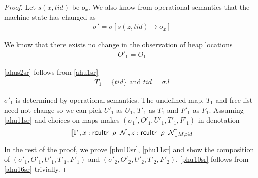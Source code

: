 \begin{proof}
Let $s(x,tid)$ be $o_x$. We also know from operational semantics that the machine state has changed as 
\begin{gather}\label{ahussr}
\sigma' =  \sigma[s(z,tid) \mapsto o_x ]
\end{gather}

We know that there exists no change in the observation of heap locations
\begin{gather}\label{ahus1sr}
O'_1 =  O_1
\end{gather}

\ref{ahus2sr} follows from \ref{ahu1sr}
\begin{gather}\label{ahus2sr}
  T_1 = \{tid\} \text{ and } tid = \sigma.l
\end{gather}

$\sigma'_1$ is determined by operational semantics. The undefined map, $T_1$ and free list need not change so we can pick $U'_1$ as $U_1$, $T'_1$  as $T_1$ and $F'_1$ as $F_1$. Assuming \ref{ahu11sr} and choices on maps makes $(\sigma_1',O'_{1},U'_{1}, T'_{1},F'_1)$ in denotation
\[\llbracket \Gamma\,, \rcuitrT{x}{G}{k}{k+1}{\_}\, , \rcuitrT{z}{G}{k}{k+1}{\_}  \rrbracket_{M,tid}\]

In the rest of the proof, we prove \ref{phu10sr}, \ref{phu11sr} and show the composition of $(\sigma'_1, O'_1, U'_1,T'_1,F'_1)$ and  $(\sigma'_2, O'_2, U'_2,T'_2,F'_2)$. \ref{phu10sr} follows from \ref{ahu16sr} trivially.


\end{proof}
